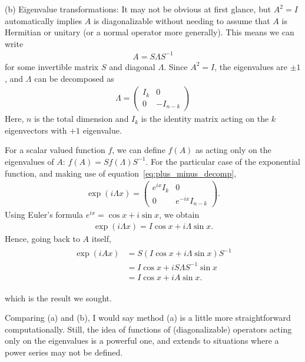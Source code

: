 \documentclass{book}
\begin{document}
    (b) Eigenvalue transformations: It may not be obvious at first glance, but $A^2 = I$ automatically implies $A$ is diagonalizable without needing to assume that $A$ is Hermitian or unitary (or a normal operator more generally). This means we can write
    \begin{align}
        A = S \Lambda S^{-1}
    \end{align}
    for some invertible matrix $S$ and diagonal $\Lambda$. Since $A^2 = I$, the eigenvalues are $\pm 1$, and $\Lambda$ can be decomposed as
    \begin{align} \label{eq:plus_minus_decomp}
        \Lambda = \begin{pmatrix}
            I_k & 0 \\
            0 & -I_{n-k}
        \end{pmatrix}
    \end{align}
    Here, $n$ is the total dimension and $I_k$ is the identity matrix acting on the $k$ eigenvectors with $+1$ eigenvalue.
    
    For a scalar valued function $f$, we can define $f(A)$ as acting only on the eigenvalues of $A$: $f(A) = S f(\Lambda) S^{-1}$. For the particular case of the exponential function, and making use of equation~\eqref{eq:plus_minus_decomp},
    \begin{align}
        \exp(i\Lambda x) = \begin{pmatrix}
            e^{i x} I_k & 0 \\
            0 & e^{-ix} I_{n-k}
        \end{pmatrix}.
    \end{align}
    Using Euler's formula $e^{ix} = \cos x + i \sin x$, we obtain
    \begin{align}
        \exp(i \Lambda x) = I \cos x + i \Lambda \sin x. 
    \end{align}
    Hence, going back to $A$ itself,
    \begin{align}
    \begin{aligned}
        \exp(i A x) &= S(I \cos x + i \Lambda \sin x)S^{-1} \\
        &= I \cos x + i S \Lambda S^{-1} \sin x \\
        &= I \cos x + i A \sin x.
    \end{aligned}
    \end{align}
    
    which is the result we sought.
    
    Comparing (a) and (b), I would say method (a) is a little more straightforward computationally. Still, the idea of functions of (diagonalizable) operators acting only on the eigenvalues is a powerful one, and extends to situations where a power series may not be defined. 
\end{document}
